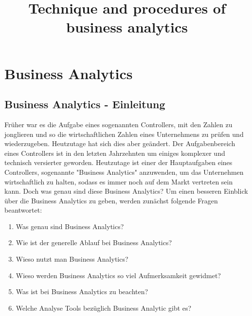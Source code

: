 \documentclass[12pt,twocolumn,twoside]{conference}   %
\title{Technique and procedures of business analytics}
\author{}
\begin{document}

\section{Business Analytics}
\subsection{Business Analytics - Einleitung}
Früher war es die Aufgabe eines sogenannten Controllers, mit den Zahlen zu jonglieren und so die wirtschaftlichen Zahlen eines Unternehmens zu prüfen und wiederzugeben. Heutzutage hat sich dies aber geändert. Der Aufgabenbereich eines Controllers ist in den letzten Jahrzehnten um einiges komplexer und technisch versierter geworden. Heutzutage ist einer der Hauptaufgaben eines Controllers, sogenannte "Business Analytics" anzuwenden, um das Unternehmen wirtschaftlich zu halten, sodass es immer noch auf dem Markt vertreten sein kann. Doch was genau sind diese Business Analytics?
Um einen besseren Einblick über die Business Analytics zu geben, werden zunächst folgende Fragen beantwortet: 

\begin{enumerate}
\item Was genau sind Business Analytics?
\item Wie ist der generelle Ablauf bei Business Analytics?
\item Wieso nutzt man Business Analytics?
\item Wieso werden Business Analytics so viel Aufmerksamkeit gewidmet?
\item Was ist bei Business Analytics zu beachten?
\item Welche Analyse Tools bezüglich Business Analytic gibt es?
\end{enumerate}
\end{document}
